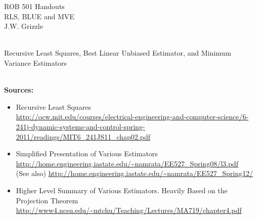 \documentclass[12pt,letterpaper,headings=normal]{scrartcl}
\begin{document}


\baselineskip=48pt  %

%

\pagestyle{plain}

\vspace*{7cm}


\begin{center}
{\Large
ROB 501 Handouts \\
RLS, BLUE and MVE
\mbox{ } \\
J.W. Grizzle \\
\mbox{ } \\
}
\end{center}



\newpage
\vspace*{10cm}
{\Large
\begin{center}
Recursive Least Squares, Best Linear Unbiased Estimator, and Minimum Variance Estimators \\
\mbox{ } \\
\end{center}
}
\newpage

\textbf{Sources:}
{\footnotesize
\begin{itemize}
\item Recursive Least Squares\\
\url{http://ocw.mit.edu/courses/electrical-engineering-and-computer-science/6-241j-dynamic-systems-and-control-spring-2011/readings/MIT6_241JS11_chap02.pdf}
\item Simplified Presentation of Various Estimators \\
\url{http://home.engineering.iastate.edu/~namrata/EE527_Spring08/l3.pdf} \\
(See also) \url{http://home.engineering.iastate.edu/~namrata/EE527_Spring12/}
\item  Higher Level Summary of Various Estimators. Heavily Based on the Projection Theorem\\
\url{http://www4.ncsu.edu/~mtchu/Teaching/Lectures/MA719/chapter4.pdf}
\end{itemize}
}
\newpage
\end{document}
